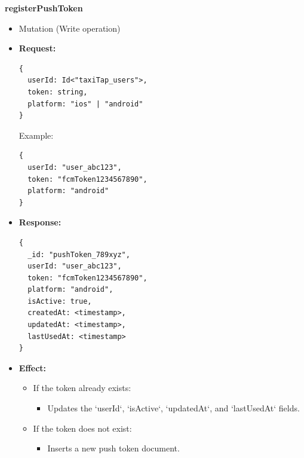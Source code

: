 \documentclass[a4paper,12pt]{article}
\begin{document}
\item \textbf{registerPushToken}
  \begin{itemize}
    \item Mutation (Write operation)
    \item \textbf{Request:}
    \begin{verbatim}
{
  userId: Id<"taxiTap_users">,
  token: string,
  platform: "ios" | "android"
}
    \end{verbatim}
    Example:
    \begin{verbatim}
{
  userId: "user_abc123",
  token: "fcmToken1234567890",
  platform: "android"
}
    \end{verbatim}
    \item \textbf{Response:}
    \begin{verbatim}
{
  _id: "pushToken_789xyz",
  userId: "user_abc123",
  token: "fcmToken1234567890",
  platform: "android",
  isActive: true,
  createdAt: <timestamp>,
  updatedAt: <timestamp>,
  lastUsedAt: <timestamp>
}
    \end{verbatim}
    \item \textbf{Effect:}
    \begin{itemize}
      \item If the token already exists:
        \begin{itemize}
          \item Updates the `userId`, `isActive`, `updatedAt`, and `lastUsedAt` fields.
        \end{itemize}
      \item If the token does not exist:
        \begin{itemize}
          \item Inserts a new push token document.
        \end{itemize}
    \end{itemize}
  \end{itemize}
\end{document}
